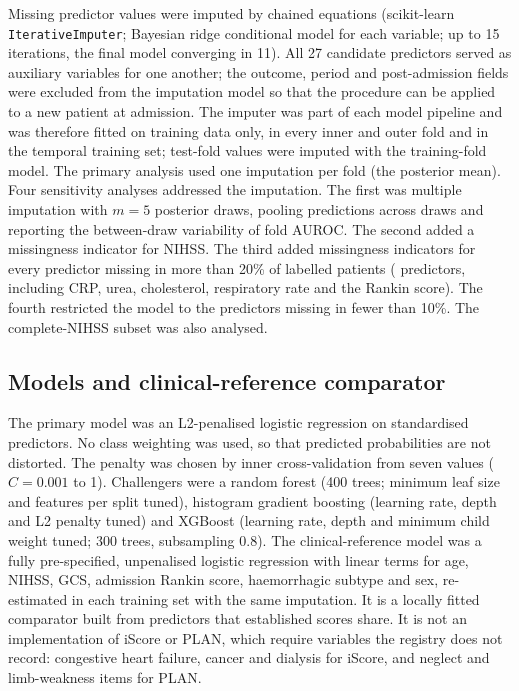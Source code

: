 \documentclass[preprint,10pt]{elsarticle}
\begin{document}
Missing predictor values were imputed by chained equations (scikit-learn \texttt{IterativeImputer}; Bayesian ridge conditional model for each variable; up to 15 iterations, the final model converging in 11). All 27 candidate predictors served as auxiliary variables for one another; the outcome, period and post-admission fields were excluded from the imputation model so that the procedure can be applied to a new patient at admission. The imputer was part of each model pipeline and was therefore fitted on training data only, in every inner and outer fold and in the temporal training set; test-fold values were imputed with the training-fold model. The primary analysis used one imputation per fold (the posterior mean). Four sensitivity analyses addressed the imputation. The first was multiple imputation with $m=5$ posterior draws, pooling predictions across draws and reporting the between-draw variability of fold AUROC. The second added a missingness indicator for NIHSS. The third added missingness indicators for every predictor missing in more than 20\% of labelled patients (\NhiMiss{} predictors, including CRP, urea, cholesterol, respiratory rate and the Rankin score). The fourth restricted the model to the \NlowMiss{} predictors missing in fewer than 10\%. The complete-NIHSS subset was also analysed.

\subsection{Models and clinical-reference comparator}
\label{sec:comparator}
The primary model was an L2-penalised logistic regression on standardised predictors. No class weighting was used, so that predicted probabilities are not distorted. The penalty was chosen by inner cross-validation from seven values ($C=0.001$ to 1). Challengers were a random forest (400 trees; minimum leaf size and features per split tuned), histogram gradient boosting (learning rate, depth and L2 penalty tuned) and XGBoost (learning rate, depth and minimum child weight tuned; 300 trees, subsampling 0.8). The clinical-reference model was a fully pre-specified, unpenalised logistic regression with linear terms for age, NIHSS, GCS, admission Rankin score, haemorrhagic subtype and sex, re-estimated in each training set with the same imputation. It is a locally fitted comparator built from predictors that established scores share. It is not an implementation of iScore or PLAN, which require variables the registry does not record: congestive heart failure, cancer and dialysis for iScore, and neglect and limb-weakness items for PLAN.
\end{document}
